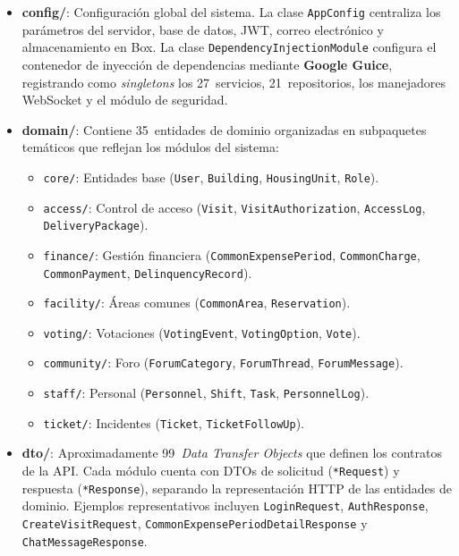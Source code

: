 \begin{itemize}
    \item \textbf{config/}: Configuración global del sistema. La clase \texttt{AppConfig} centraliza los parámetros del servidor, base de datos, JWT, correo electrónico y almacenamiento en Box. La clase \texttt{DependencyInjectionModule} configura el contenedor de inyección de dependencias mediante \textbf{Google Guice}, registrando como \textit{singletons} los 27~servicios, 21~repositorios, los manejadores WebSocket y el módulo de seguridad.

    \item \textbf{domain/}: Contiene 35~entidades de dominio organizadas en subpaquetes temáticos que reflejan los módulos del sistema:
    \begin{itemize}
        \item \texttt{core/}: Entidades base (\texttt{User}, \texttt{Building}, \texttt{HousingUnit}, \texttt{Role}).
        \item \texttt{access/}: Control de acceso (\texttt{Visit}, \texttt{VisitAuthorization}, \texttt{AccessLog}, \texttt{DeliveryPackage}).
        \item \texttt{finance/}: Gestión financiera (\texttt{CommonExpensePeriod}, \texttt{CommonCharge}, \texttt{CommonPayment}, \texttt{DelinquencyRecord}).
        \item \texttt{facility/}: Áreas comunes (\texttt{CommonArea}, \texttt{Reservation}).
        \item \texttt{voting/}: Votaciones (\texttt{VotingEvent}, \texttt{VotingOption}, \texttt{Vote}).
        \item \texttt{community/}: Foro (\texttt{ForumCategory}, \texttt{ForumThread}, \texttt{ForumMessage}).
        \item \texttt{staff/}: Personal (\texttt{Personnel}, \texttt{Shift}, \texttt{Task}, \texttt{PersonnelLog}).
        \item \texttt{ticket/}: Incidentes (\texttt{Ticket}, \texttt{TicketFollowUp}).
    \end{itemize}

    \item \textbf{dto/}: Aproximadamente 99~\textit{Data Transfer Objects} que definen los contratos de la API. Cada módulo cuenta con DTOs de solicitud (\texttt{*Request}) y respuesta (\texttt{*Response}), separando la representación HTTP de las entidades de dominio. Ejemplos representativos incluyen \texttt{LoginRequest}, \texttt{AuthResponse}, \texttt{CreateVisitRequest}, \texttt{CommonExpensePeriodDetailResponse} y \texttt{ChatMessageResponse}.


\end{itemize}

